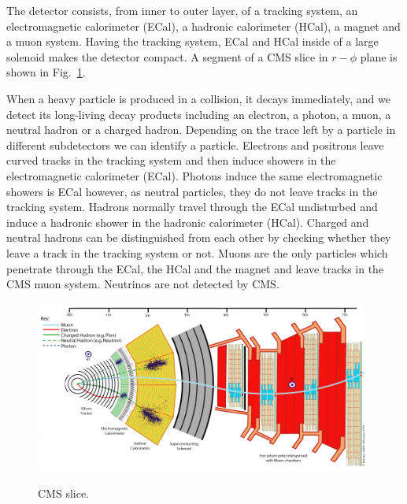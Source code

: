 The detector consists, from inner to outer layer,  of a tracking system, an electromagnetic calorimeter (ECal), a hadronic calorimeter (HCal), a magnet and a muon system. Having the tracking system, ECal and HCal inside of a large solenoid makes the detector compact. A segment of a CMS slice in $r-\phi$ plane is shown in Fig.~\ref{fig:CMS_slice}.

When a heavy particle is produced in a collision, it decays immediately, and we detect its long-living decay products including an electron, a photon, a muon, a neutral hadron or a charged hadron. Depending on the trace left by a particle in different subdetectors we can identify a particle. Electrons and positrons leave curved tracks in the tracking system and then induce showers in the electromagnetic calorimeter (ECal). Photons induce the same electromagnetic showers is ECal however, as neutral particles, they do not leave tracks in the tracking system. Hadrons normally travel through the ECal undisturbed and induce a hadronic shower in the hadronic calorimeter (HCal). Charged and neutral hadrons can be distinguished from each other by checking whether they leave a track in the tracking system or not. Muons are the only particles which penetrate through the ECal, the HCal and the magnet and leave tracks in the CMS muon system. Neutrinos are not detected by CMS.   

\begin{figure}[htb]
  \begin{center}
    {\includegraphics[width=0.98\textwidth]{../figs/Exp/CMS_Slice.png}}
    \caption{CMS slice.}
    \label{fig:CMS_slice}
  \end{center}
\end{figure}


